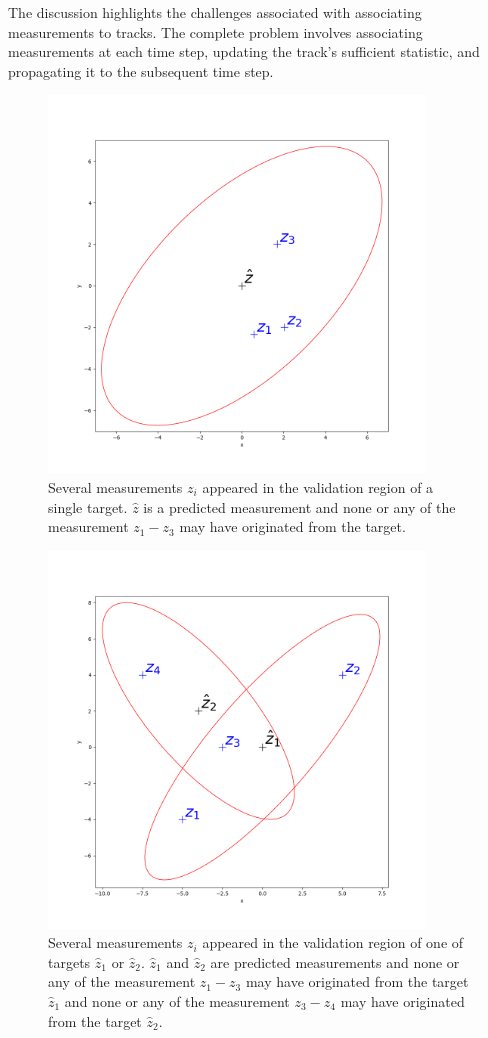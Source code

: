 The discussion highlights the challenges associated with associating measurements to tracks. The complete problem
involves associating measurements at each time step, updating the track's sufficient statistic, and propagating it to
the subsequent time step.
\begin{figure}[H]
    \centering
    \includegraphics[width=10cm]{text/chapter_02/imgs/clutter_singleTarget}
    \caption{Several measurements $z_i$ appeared in the validation region of a single target. $\hat{z}$ is a predicted
    measurement and none or any of the measurement $z_1 - z_3$ may have originated from the target.}
    \label{fig:singleTargetInClutter}
\end{figure}

\begin{figure}[H]
    \centering
    \includegraphics[width=10cm]{text/chapter_02/imgs/clutter_multiTarget}
    \caption{Several measurements $z_i$ appeared in the validation region of one of targets $\hat{z}_1$ or $\hat{z}_2$. $\hat{z}_1$ and $\hat{z}_2$ are predicted
    measurements and none or any of the measurement $z_1 - z_3$ may have originated from the target $\hat{z}_1$ and none or any of the measurement $z_3 - z_4$ may have originated from the target $\hat{z}_2$.}
    \label{fig:twoTargetsInClutter}
\end{figure}


